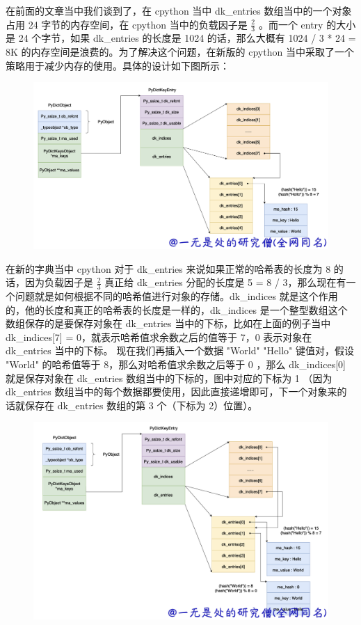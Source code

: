 在前面的文章当中我们谈到了，在 cpython 当中 dk\_entries 数组当中的一个对象占用 24 字节的内存空间，在 cpython 当中的负载因子是 $\frac{2}{3}$ 。而一个 entry 的大小是 24 个字节，如果 dk\_entries 的长度是 1024 的话，那么大概有 1024  / 3 * 24 = 8K 的内存空间是浪费的。为了解决这个问题，在新版的 cpython 当中采取了一个策略用于减少内存的使用。具体的设计如下图所示：

    \begin{figure}[h]
        \centering
            \includegraphics[scale=.2]{images/33-dict.png}
						\caption{ }
        \label{fig:my_label}
    \end{figure}
    
在新的字典当中 cpython 对于 dk\_entries 来说如果正常的哈希表的长度为 8 的话，因为负载因子是 $\frac{2}{3}$ 真正给 dk\_entries 分配的长度是 5 = 8 / 3，那么现在有一个问题就是如何根据不同的哈希值进行对象的存储。dk\_indices 就是这个作用的，他的长度和真正的哈希表的长度是一样的，dk\_indices 是一个整型数组这个数组保存的是要保存对象在 dk\_entries 当中的下标，比如在上面的例子当中 dk\_indices[7] = 0，就表示哈希值求余数之后的值等于 7，0 表示对象在 dk\_entries 当中的下标。
现在我们再插入一个数据 "World" "Hello" 键值对，假设 "World" 的哈希值等于 8，那么对哈希值求余数之后等于 0 ，那么 dk\_indices[0] 就是保存对象在 dk\_entries 数组当中的下标的，图中对应的下标为 1 （因为 dk\_entries 数组当中的每个数据都要使用，因此直接递增即可，下一个对象来的话就保存在 dk\_entries 数组的第 3 个（下标为 2）位置）。

    \begin{figure}[h]
        \centering
            \includegraphics[scale=.2]{images/34-dict.png}
						\caption{ }
        \label{fig:my_label}
    \end{figure}
    
